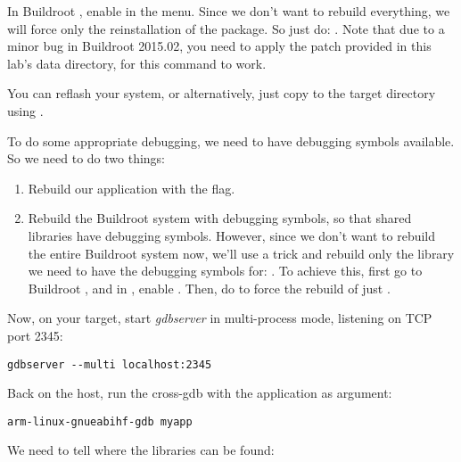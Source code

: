 In Buildroot , enable
 in the 
menu. Since we don't want to rebuild everything, we will force only
the reinstallation of the  package. So just
do: . Note that due to a
minor bug in Buildroot 2015.02, you need to apply the patch
provided in this lab's data directory, for this
 command to work.

You can reflash your system, or alternatively, just copy
 to the target 
directory using .

To do some appropriate debugging, we need to have debugging symbols
available. So we need to do two things:

\begin{enumerate}

\item Rebuild our application with the  flag.

\item Rebuild the Buildroot system with debugging symbols, so that
  shared libraries have debugging symbols. However, since we don't
  want to rebuild the entire Buildroot system now, we'll use a trick
  and rebuild only the library we need to have the debugging symbols
  for: . To achieve this, first go to Buildroot
  , and in , enable
  . Then, do  to force the rebuild of just
  .

\end{enumerate}

Now, on your target, start {\em gdbserver} in multi-process mode,
listening on TCP port 2345:

\begin{verbatim}
gdbserver --multi localhost:2345
\end{verbatim}

Back on the host, run the cross-gdb with the  application
as argument:

\begin{verbatim}
arm-linux-gnueabihf-gdb myapp
\end{verbatim}

We need to tell  where the libraries can be found:


